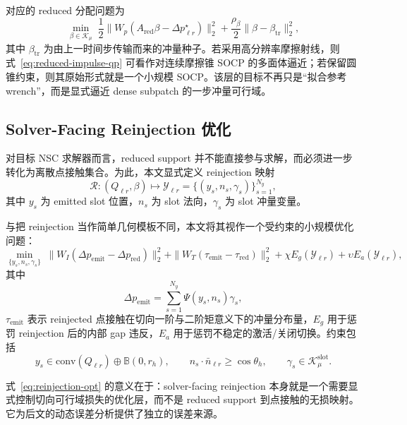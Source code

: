 对应的 reduced 分配问题为
\begin{equation}
\min_{\beta \in \mathcal{K}_{\mu}}
\;
\frac{1}{2}
\|W_p(A_{\mathrm{red}}\beta-\Delta p_{\ell r}^{\star})\|_2^2
+
\frac{\rho_{\beta}}{2}\|\beta-\beta_{\mathrm{tr}}\|_2^2,
\label{eq:reduced-impulse-qp}
\end{equation}
其中 $\beta_{\mathrm{tr}}$ 为由上一时间步传输而来的冲量种子。若采用高分辨率摩擦射线，则式~\eqref{eq:reduced-impulse-qp} 可看作对连续摩擦锥 SOCP 的多面体逼近；若保留圆锥约束，则其原始形式就是一个小规模 SOCP。该层的目标不再只是“拟合参考 wrench”，而是显式逼近 dense subpatch 的一步冲量可行域。

\subsection{Solver-Facing Reinjection 优化}

对目标 NSC 求解器而言，reduced support 并不能直接参与求解，而必须进一步转化为离散点接触集合。为此，本文显式定义 reinjection 映射
\begin{equation}
\mathcal{R}:
\left(Q_{\ell r}, \beta\right)
\mapsto
\mathcal{Y}_{\ell r}
=
\{(y_s,n_s,\gamma_s)\}_{s=1}^{N_y},
\end{equation}
其中 $y_s$ 为 emitted slot 位置，$n_s$ 为 slot 法向，$\gamma_s$ 为 slot 冲量变量。

与把 reinjection 当作简单几何模板不同，本文将其视作一个受约束的小规模优化问题：
\begin{equation}
\min_{\{y_s,n_s,\gamma_s\}}
\;
\|W_I(\Delta p_{\mathrm{emit}}-\Delta p_{\mathrm{red}})\|_2^2
+
\|W_T(\tau_{\mathrm{emit}}-\tau_{\mathrm{red}})\|_2^2
+
\chi E_g(\mathcal{Y}_{\ell r})
+
\upsilon E_a(\mathcal{Y}_{\ell r}),
\label{eq:reinjection-opt}
\end{equation}
其中
\begin{equation}
\Delta p_{\mathrm{emit}}
=
\sum_{s=1}^{N_y}\Psi(y_s,n_s)\gamma_s,
\end{equation}
$\tau_{\mathrm{emit}}$ 表示 reinjected 点接触在切向一阶与二阶矩意义下的冲量分布量，$E_g$ 用于惩罚 reinjection 后的内部 gap 违反，$E_a$ 用于惩罚不稳定的激活/关闭切换。约束包括
\begin{equation}
y_s \in \mathrm{conv}(Q_{\ell r}) \oplus \mathbb{B}(0,r_h),
\qquad
n_s \cdot \bar{n}_{\ell r} \ge \cos\theta_h,
\qquad
\gamma_s \in \mathcal{K}_{\mu}^{\mathrm{slot}}.
\end{equation}

式~\eqref{eq:reinjection-opt} 的意义在于：solver-facing reinjection 本身就是一个需要显式控制切向可行域损失的优化层，而不是 reduced support 到点接触的无损映射。它为后文的动态误差分析提供了独立的误差来源。

